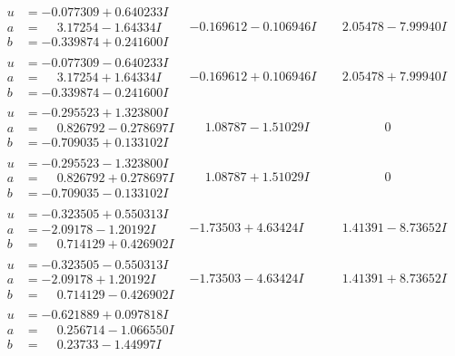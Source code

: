 \documentclass[1p]{elsarticle_modified}
\theoremstyle{definition}
\begin{document}
$$\begin{array}{c|c|c}
\begin{aligned}
u &= -0.077309 + 0.640233 I \\
a &= \phantom{-}3.17254 - 1.64334 I \\
b &= -0.339874 + 0.241600 I\end{aligned}
 & -0.169612 - 0.106946 I & \phantom{-}2.05478 - 7.99940 I \\ \hline\begin{aligned}
u &= -0.077309 - 0.640233 I \\
a &= \phantom{-}3.17254 + 1.64334 I \\
b &= -0.339874 - 0.241600 I\end{aligned}
 & -0.169612 + 0.106946 I & \phantom{-}2.05478 + 7.99940 I \\ \hline\begin{aligned}
u &= -0.295523 + 1.323800 I \\
a &= \phantom{-}0.826792 - 0.278697 I \\
b &= -0.709035 + 0.133102 I\end{aligned}
 & \phantom{-}1.08787 - 1.51029 I & \phantom{-0.000000 } 0 \\ \hline\begin{aligned}
u &= -0.295523 - 1.323800 I \\
a &= \phantom{-}0.826792 + 0.278697 I \\
b &= -0.709035 - 0.133102 I\end{aligned}
 & \phantom{-}1.08787 + 1.51029 I & \phantom{-0.000000 } 0 \\ \hline\begin{aligned}
u &= -0.323505 + 0.550313 I \\
a &= -2.09178 - 1.20192 I \\
b &= \phantom{-}0.714129 + 0.426902 I\end{aligned}
 & -1.73503 + 4.63424 I & \phantom{-}1.41391 - 8.73652 I \\ \hline\begin{aligned}
u &= -0.323505 - 0.550313 I \\
a &= -2.09178 + 1.20192 I \\
b &= \phantom{-}0.714129 - 0.426902 I\end{aligned}
 & -1.73503 - 4.63424 I & \phantom{-}1.41391 + 8.73652 I \\ \hline\begin{aligned}
u &= -0.621889 + 0.097818 I \\
a &= \phantom{-}0.256714 - 1.066550 I \\
b &= \phantom{-}0.23733 - 1.44997 I\end{aligned}

\end{array}$$
\end{document}
